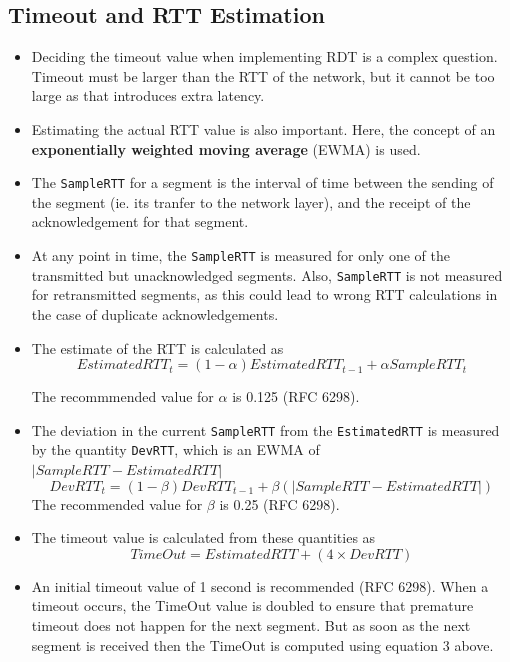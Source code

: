 \documentclass{article}
\theoremstyle{plain}
\theoremstyle{definition}
\begin{document}
\subsection{Timeout and RTT Estimation}
\begin{itemize}
    \item Deciding the timeout value when implementing RDT is a complex question. Timeout must be larger than the RTT of the network, but it cannot be too large as that introduces extra latency. 
    
    \item Estimating the actual RTT value is also important. Here, the concept of an \textbf{exponentially weighted moving average} (EWMA) is used. 
    
    \item The \texttt{SampleRTT} for a segment is the interval of time between the sending of the segment (ie. its tranfer to the network layer), and the receipt of the acknowledgement for that segment. 
    
    \item At any point in time, the \texttt{SampleRTT} is measured for only one of the transmitted but unacknowledged segments. Also, \texttt{SampleRTT} is not measured for retransmitted segments, as this could lead to wrong RTT calculations in the case of duplicate acknowledgements. 
    
    \item The estimate of the RTT is calculated as
    \begin{equation}
        EstimatedRTT_{t} = (1-\alpha) EstimatedRTT_{t-1} + \alpha SampleRTT_t
    \end{equation}
    
    The recommmended value for $\alpha$ is 0.125 (RFC 6298). 
    
    \item The deviation in the current \texttt{SampleRTT} from the \texttt{EstimatedRTT} is measured by the quantity \texttt{DevRTT}, which is an EWMA of $|SampleRTT - EstimatedRTT|$
    \begin{equation}
        DevRTT_t = (1-\beta) DevRTT_{t-1} + \beta( |SampleRTT - EstimatedRTT|)
    \end{equation}
    The recommended value for $\beta$ is 0.25 (RFC 6298).
    
    \item The timeout value is calculated from these quantities as
    \begin{equation}
        TimeOut = EstimatedRTT + (4 \times DevRTT)
    \end{equation}
    
    \item An initial timeout value of 1 second is recommended (RFC 6298). When a timeout occurs, the TimeOut value is doubled to ensure that premature timeout does not happen for the next segment. But as soon as the next segment is received then the TimeOut is computed using equation 3 above. 
\end{itemize}
\end{document}
